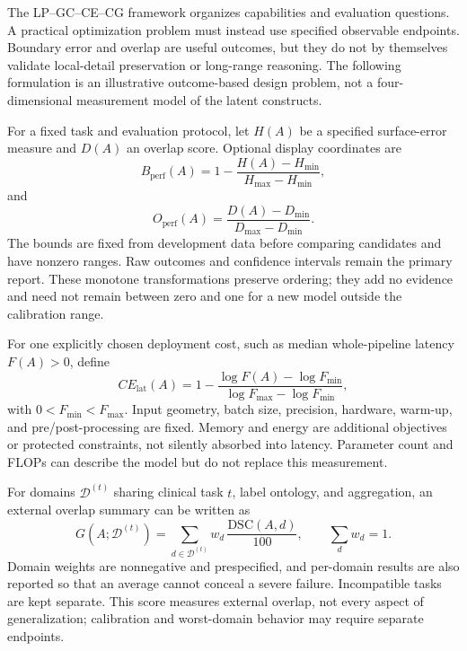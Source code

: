 \documentclass[5p,times,authoryear]{elsarticle}
\begin{document}
The LP--GC--CE--CG framework organizes capabilities and evaluation questions. A practical optimization problem must instead use specified observable endpoints. Boundary error and overlap are useful outcomes, but they do not by themselves validate local-detail preservation or long-range reasoning. The following formulation is an illustrative outcome-based design problem, not a four-dimensional measurement model of the latent constructs.

For a fixed task and evaluation protocol, let $H(A)$ be a specified surface-error measure and $D(A)$ an overlap score. Optional display coordinates are
\begin{equation}
B_{\mathrm{perf}}(A)=1-\frac{H(A)-H_{\min}}{H_{\max}-H_{\min}},
\end{equation}
and
\begin{equation}
O_{\mathrm{perf}}(A)=\frac{D(A)-D_{\min}}{D_{\max}-D_{\min}}.
\end{equation}
The bounds are fixed from development data before comparing candidates and have nonzero ranges. Raw outcomes and confidence intervals remain the primary report. These monotone transformations preserve ordering; they add no evidence and need not remain between zero and one for a new model outside the calibration range.

For one explicitly chosen deployment cost, such as median whole-pipeline latency $F(A)>0$, define
\begin{equation}
CE_{\mathrm{lat}}(A)
=1-\frac{\log F(A)-\log F_{\min}}
{\log F_{\max}-\log F_{\min}},
\label{eq:ce_perf}
\end{equation}
with $0<F_{\min}<F_{\max}$. Input geometry, batch size, precision, hardware, warm-up, and pre/post-processing are fixed. Memory and energy are additional objectives or protected constraints, not silently absorbed into latency. Parameter count and FLOPs can describe the model but do not replace this measurement.

For domains $\mathcal D^{(t)}$ sharing clinical task $t$, label ontology, and aggregation, an external overlap summary can be written as
\begin{equation}
G(A;\mathcal D^{(t)})=
\sum_{d\in\mathcal D^{(t)}}w_d\,\frac{\mathrm{DSC}(A,d)}{100},
\qquad \sum_d w_d=1.
\end{equation}
Domain weights are nonnegative and prespecified, and per-domain results are also reported so that an average cannot conceal a severe failure. Incompatible tasks are kept separate. This score measures external overlap, not every aspect of generalization; calibration and worst-domain behavior may require separate endpoints.
\end{document}
